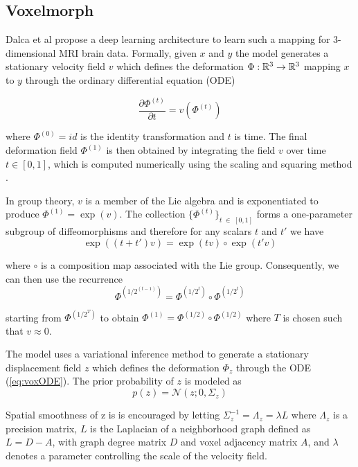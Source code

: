 \subsection{Voxelmorph} \label{sec:vox}
Dalca et al \cite{dalca2018unsupervised} propose a deep learning architecture to learn such a mapping for 3-dimensional MRI brain data. Formally, given $x$ and $y$ the model generates a stationary velocity field $v$ which defines the deformation ${\Phi : \mathbb{R}^3 \rightarrow \mathbb{R}^3}$ mapping $x$ to $y$ through the ordinary differential equation (ODE)

\begin{equation} \label{eq:voxODE}
	\frac{\partial \Phi^{(t)}}{\partial t} = v(\Phi^{(t)})
\end{equation}

where $\Phi^{(0)} = id$ is the identity transformation and $t$ is time.
The final deformation field $\Phi^{(1)}$ is then obtained by integrating the field $v$ over time $t \in [0, 1]$, which is computed numerically using the scaling and squaring method \cite{arsigny2006log}.

In group theory, $v$ is a member of the Lie algebra and is exponentiated to produce $\Phi^{(1)} = \exp(v)$.
The collection $\{\Phi^{(t)}\}_{t \; \in \; [0,1]}$ forms a one-parameter subgroup of diffeomorphisms and therefore for any scalars $t$ and $t'$ we have 
\begin{equation} \label{eq:voxoneparamsubgroup}
	\exp((t + t')v) = \exp(tv) \circ \exp(t'v)
\end{equation}

where $\circ$ is a composition map associated with the Lie group. Consequently, we can then use the recurrence
\begin{equation} \label{eq:voxrecurrence}
	\Phi^{(1/2^{(t-1)})} = \Phi^{(1/2^{t})} \circ \Phi^{(1/2^{t})}
\end{equation}

starting from $\Phi^{(1/2^T)}$ to obtain $\Phi^{(1)} = \Phi^{(1/2)} \circ \Phi^{(1/2)}$ where $T$ is chosen such that $v \approx 0$.

The model uses a variational inference method to generate a stationary displacement field $z$ which defines the deformation $\Phi_z$ through the ODE (\ref{eq:voxODE}). The prior probability of $z$ is modeled as
\begin{equation}
	p(z) = \mathcal{N}(z; 0, \Sigma_z)
\end{equation}

Spatial smoothness of z is is encouraged by letting ${\Sigma_z^{-1} = \Lambda_z = \lambda L}$ where $\Lambda_z$ is a precision matrix, $L$ is the Laplacian of a neighborhood graph defined as $L = D - A$, with graph degree matrix $D$ and voxel adjacency matrix $A$, and $\lambda$ denotes a parameter controlling the scale of the velocity field.

